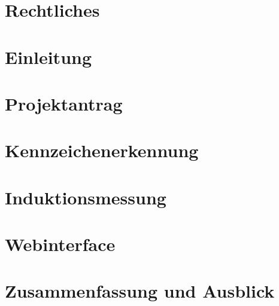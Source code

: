 \documentclass[12pt]{article}
\begin{document}
\section{Rechtliches}
\pagebreak

\section{Einleitung}

\pagebreak

\section{Projektantrag}

\pagebreak

\section{Kennzeichenerkennung}

\pagebreak

\section{Induktionsmessung}

\pagebreak

\section{Webinterface}

\pagebreak

\section{Zusammenfassung und Ausblick}

\pagebreak

%

%

%
\end{document}
